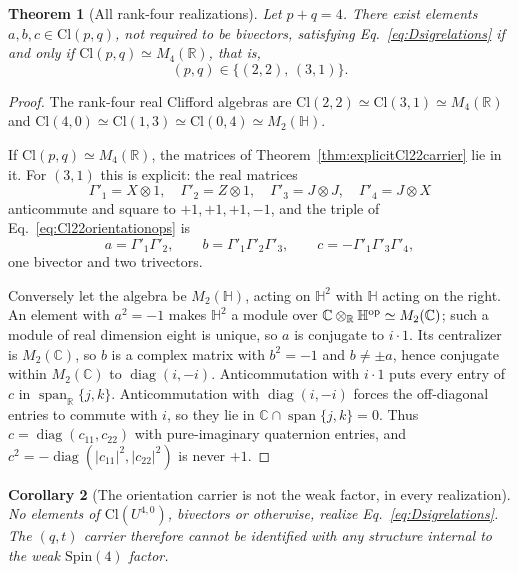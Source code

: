 \documentclass[11pt]{article}
\newtheorem{theorem}{Theorem}[section]
\newtheorem{corollary}[theorem]{Corollary}
\theoremstyle{definition}\newtheorem{definition}[theorem]{Definition}
\theoremstyle{remark}\newtheorem{remark}[theorem]{Remark}\newtheorem{conjecture}[theorem]{Conjecture}
\begin{document}
\begin{theorem}[All rank-four realizations]\label{thm:Dsignaturegeneral}
Let $p+q=4$. There exist elements $a,b,c\in\mathrm{Cl}(p,q)$, not required to be bivectors, satisfying Eq.~\eqref{eq:Dsigrelations} if and only if $\mathrm{Cl}(p,q)\simeq M_4(\mathbb R)$, that is,
\begin{equation}\label{eq:Dsiggeneral}
 \boxed{(p,q)\in\{(2,2),\,(3,1)\}.}
\end{equation}
\end{theorem}
\begin{proof}
The rank-four real Clifford algebras are $\mathrm{Cl}(2,2)\simeq\mathrm{Cl}(3,1)\simeq M_4(\mathbb R)$ and $\mathrm{Cl}(4,0)\simeq\mathrm{Cl}(1,3)\simeq\mathrm{Cl}(0,4)\simeq M_2(\mathbb H)$.

If $\mathrm{Cl}(p,q)\simeq M_4(\mathbb R)$, the matrices of Theorem~\ref{thm:explicitCl22carrier} lie in it. For $(3,1)$ this is explicit: the real matrices
\begin{equation}
 \Gamma'_1=X\otimes1,\quad \Gamma'_2=Z\otimes1,\quad \Gamma'_3=J\otimes J,\quad \Gamma'_4=J\otimes X
\end{equation}
anticommute and square to $+1,+1,+1,-1$, and the triple of Eq.~\eqref{eq:Cl22orientationops} is
\begin{equation}
 a=\Gamma'_1\Gamma'_2,\qquad b=\Gamma'_1\Gamma'_2\Gamma'_3,\qquad c=-\Gamma'_1\Gamma'_3\Gamma'_4,
\end{equation}
one bivector and two trivectors.

Conversely let the algebra be $M_2(\mathbb H)$, acting on $\mathbb H^2$ with $\mathbb H$ acting on the right. An element with $a^2=-1$ makes $\mathbb H^2$ a module over $\mathbb C\otimes_{\mathbb R}\mathbb H^{\rm op}\simeq M_2(\mathbb C)$; such a module of real dimension eight is unique, so $a$ is conjugate to $i\cdot1$. Its centralizer is $M_2(\mathbb C)$, so $b$ is a complex matrix with $b^2=-1$ and $b\neq\pm a$, hence conjugate within $M_2(\mathbb C)$ to $\operatorname{diag}(i,-i)$. Anticommutation with $i\cdot1$ puts every entry of $c$ in $\operatorname{span}_{\mathbb R}\{j,k\}$. Anticommutation with $\operatorname{diag}(i,-i)$ forces the off-diagonal entries to commute with $i$, so they lie in $\mathbb C\cap\operatorname{span}\{j,k\}=0$. Thus $c=\operatorname{diag}(c_{11},c_{22})$ with pure-imaginary quaternion entries, and $c^2=-\operatorname{diag}(|c_{11}|^2,|c_{22}|^2)$ is never $+1$.
\end{proof}

\begin{corollary}[The orientation carrier is not the weak factor, in every realization]\label{cor:DnotU40}
No elements of $\mathrm{Cl}(U^{4,0})$, bivectors or otherwise, realize Eq.~\eqref{eq:Dsigrelations}. The $(q,t)$ carrier therefore cannot be identified with any structure internal to the weak $\mathrm{Spin}(4)$ factor.
\end{corollary}
\end{document}
